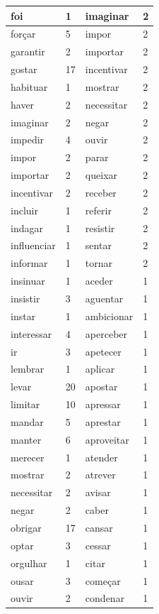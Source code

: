 \documentclass[output=paper,colorlinks,citecolor=brown]{langscibook}
\begin{document}
\begin{longtable}{ p{3cm} | p{1cm} | p{3cm} | p{1cm} }
			foi & 1 & imaginar & 2\\\hline
			forçar & 5 & impor & 2\\\hline
			garantir & 2 & importar & 2\\\hline
			gostar & 17 & incentivar & 2\\\hline
			habituar & 1 & mostrar & 2\\\hline
			haver & 2 & necessitar & 2\\\hline
			imaginar & 2 & negar & 2\\\hline
			impedir & 4 & ouvir & 2\\\hline
			impor & 2 & parar & 2\\\hline
			importar & 2 & queixar & 2\\\hline
			incentivar & 2 & receber & 2\\\hline
			incluir & 1 & referir & 2\\\hline
			indagar & 1 & resistir & 2\\\hline
			influenciar & 1 & sentar & 2\\\hline
			informar & 1 & tornar & 2\\\hline
			insinuar & 1 & aceder & 1\\\hline
			insistir & 3 & aguentar & 1\\\hline
			instar & 1 & ambicionar & 1\\\hline
			interessar & 4 & aperceber & 1\\\hline
			ir & 3 & apetecer & 1\\\hline
			lembrar & 1 & aplicar & 1\\\hline
			levar & 20 & apostar & 1\\\hline
			limitar & 10 & apressar & 1\\\hline
			mandar & 5 & aprestar & 1\\\hline
			manter & 6 & aproveitar & 1\\\hline
			merecer & 1 & atender & 1\\\hline
			mostrar & 2 & atrever & 1\\\hline
			necessitar & 2 & avisar & 1\\\hline
			negar & 2 & caber & 1\\\hline
			obrigar & 17 & cansar & 1\\\hline
			optar & 3 & cessar & 1\\\hline
			orgulhar & 1 & citar & 1\\\hline
			ousar & 3 & começar & 1\\\hline
			ouvir & 2 & condenar & 1\\\hline

\end{longtable}
\end{document}
